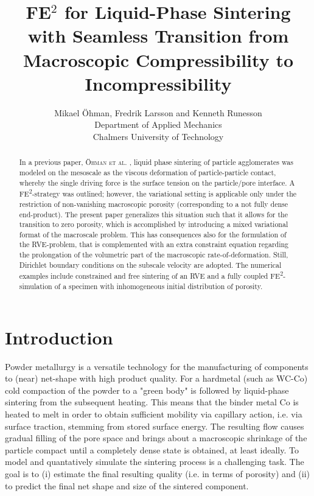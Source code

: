 \documentclass[10pt,a4paper]{article}
\begin{document}
\title{FE$^2$ for Liquid-Phase Sintering with Seamless Transition from Macroscopic Compressibility to Incompressibility}

\author{
Mikael Öhman, Fredrik Larsson and Kenneth Runesson\\
Department of Applied Mechanics \\
Chalmers University of Technology}

\maketitle

\begin{abstract}
\noindent In a previous paper, \textsc{Öhman et al.} \cite{OhmanRunLar2011}, liquid phase sintering of particle agglomerates was modeled on the mesoscale as the viscous deformation of particle-particle contact, whereby the single driving force is the surface tension on the particle/pore interface. A FE\textsuperscript{2}-strategy was outlined; however, the variational setting is applicable only under the restriction of non-vanishing macroscopic porosity (corresponding to a not fully dense end-product). The present paper generalizes this situation such that it allows for the transition to zero porosity, which is accomplished by introducing a mixed variational format of the macroscale problem. This has consequences also for the formulation of the RVE-problem, that is complemented with an extra constraint equation regarding the prolongation of the volumetric part of the macroscopic rate-of-deformation. Still, Dirichlet boundary conditions on the subscale velocity are adopted. The numerical examples include constrained and free sintering of an RVE and a fully coupled FE\textsuperscript{2}-simulation of a specimen with inhomogeneous initial distribution of porosity.

\end{abstract}

\section{Introduction}

Powder metallurgy is a versatile technology for the manufacturing of components to (near) net-shape with high product quality. For a hardmetal (such as WC-Co) cold compaction of the powder to a "green body" is followed by liquid-phase sintering from the subsequent heating. This means that the binder metal Co is heated to melt in order to obtain sufficient mobility via capillary action, i.e. via surface traction, stemming from stored surface energy. The resulting flow causes gradual filling of the pore space and brings about a macroscopic shrinkage of the particle compact until a completely dense state is obtained, at least ideally. To model and quantatively simulate the sintering process is a challenging task. The goal is to (i) estimate the final resulting quality (i.e. in terms of porosity) and (ii) to predict the final net shape and size of the sintered component.
\end{document}
